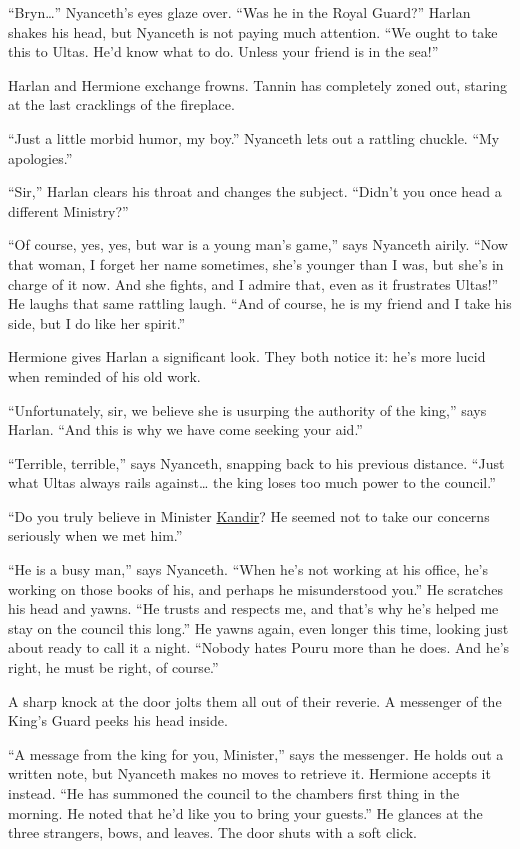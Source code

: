 \documentclass[smalldemyvopaper,11pt,twoside,onecolumn,openright,extrafontsizes]{memoir}
\begin{document}
``Bryn\ldots{}'' Nyanceth's eyes glaze over. ``Was he in the Royal
Guard?'' Harlan shakes his head, but Nyanceth is not paying much
attention. ``We ought to take this to Ultas. He'd know what to do.
Unless your friend is in the sea!''

Harlan and Hermione exchange frowns. Tannin has completely zoned out,
staring at the last cracklings of the fireplace.

``Just a little morbid humor, my boy.'' Nyanceth lets out a rattling
chuckle. ``My apologies.''

``Sir,'' Harlan clears his throat and changes the subject. ``Didn't you
once head a different Ministry?''

``Of course, yes, yes, but war is a young man's game,'' says Nyanceth
airily. ``Now that woman, I forget her name sometimes, she's younger
than I was, but she's in charge of it now. And she fights, and I admire
that, even as it frustrates Ultas!'' He laughs that same rattling laugh.
``And of course, he is my friend and I take his side, but I do like her
spirit.''

Hermione gives Harlan a significant look. They both notice it: he's more
lucid when reminded of his old work.

``Unfortunately, sir, we believe she is usurping the authority of the
king,'' says Harlan. ``And this is why we have come seeking your aid.''

``Terrible, terrible,'' says Nyanceth, snapping back to his previous
distance. ``Just what Ultas always rails against\ldots{} the king loses
too much power to the council.''

``Do you truly believe in Minister \href{/characters/kandir/}{Kandir}?
He seemed not to take our concerns seriously when we met him.''

``He is a busy man,'' says Nyanceth. ``When he's not working at his
office, he's working on those books of his, and perhaps he misunderstood
you.'' He scratches his head and yawns. ``He trusts and respects me, and
that's why he's helped me stay on the council this long.'' He yawns
again, even longer this time, looking just about ready to call it a
night. ``Nobody hates Pouru more than he does. And he's right, he must
be right, of course.''

A sharp knock at the door jolts them all out of their reverie. A
messenger of the King's Guard peeks his head inside.

``A message from the king for you, Minister,'' says the messenger. He
holds out a written note, but Nyanceth makes no moves to retrieve it.
Hermione accepts it instead. ``He has summoned the council to the
chambers first thing in the morning. He noted that he'd like you to
bring your guests.'' He glances at the three strangers, bows, and
leaves. The door shuts with a soft click.
\end{document}
